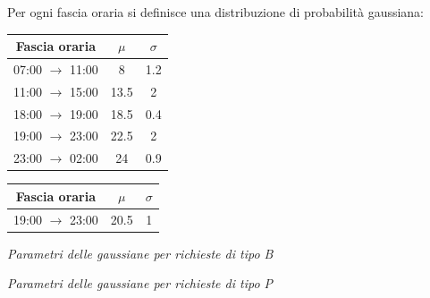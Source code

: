 \documentclass[a4paper, 12pt]{article}
\begin{document}
Per ogni fascia oraria si definisce una distribuzione di probabilità gaussiana:\\

\begin{minipage}{0.45\textwidth}
\begin{table}[H]
\centering
\begin{tabular}{ |c|c|c| }
	\hline
    \cellcolor{cellcolor} Fascia oraria & \cellcolor{cellcolor}$\mu$ & \cellcolor{cellcolor}$\sigma$\\
	\hline
    \hline

  	07:00 $\rightarrow$ 11:00 & 8 & 1.2 \\
    \hline	
	
	11:00 $\rightarrow$ 15:00 & 13.5 & 2 \\
    \hline
  
	18:00 $\rightarrow$ 19:00 & 18.5 & 0.4 \\  
    \hline
    
	19:00 $\rightarrow$ 23:00 & 22.5 & 2\\
    \hline
    
    23:00 $\rightarrow$ 02:00 & 24 & 0.9 \\
    \hline        
\end{tabular}
\end{table}
\end{minipage}
\hspace{0.1\textwidth}
\begin{minipage}{0.45\textwidth}
\begin{table}[H]
\centering
\begin{tabular}{ |c|c|c| }
	\hline
    \cellcolor{cellcolor} Fascia oraria & \cellcolor{cellcolor}$\mu$ & \cellcolor{cellcolor}$\sigma$\\
	\hline
    \hline
    19:00 $\rightarrow$ 23:00 & 20.5 & 1\\
    \hline
\end{tabular}
\end{table}
\end{minipage}
\bigskip

\begin{minipage}{0.45\textwidth}
\centering
\textit{Parametri delle gaussiane per richieste di tipo B}
\end{minipage}
\hspace{0.1\textwidth}
\begin{minipage}{0.45\textwidth}
\centering
\textit{Parametri delle gaussiane per richieste di tipo P}
\end{minipage}
\bigskip
\end{document}
